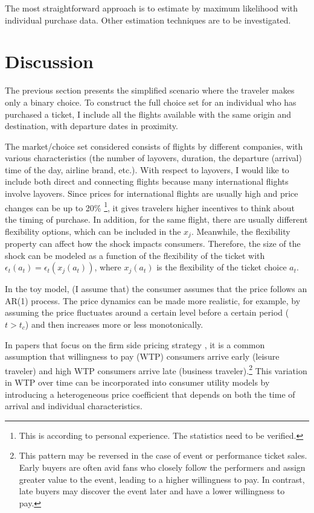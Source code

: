 \documentclass[12pt]{article}
\begin{document}
The most straightforward approach is to estimate by maximum likelihood with
individual purchase data. Other estimation techniques are to be investigated.

\section{Discussion}

The previous section presents the simplified scenario where the traveler makes
only a binary choice. To construct the full choice set for an individual who
has purchased a ticket, I include all the flights available with the same
origin and destination, with departure dates in proximity.

The market/choice set considered consists of flights by different companies,
with various characteristics (the number of layovers, duration, the departure
(arrival) time of the day, airline brand, etc.). With respect to layovers, I
would like to include both direct and connecting flights because many
international flights involve layovers. Since prices for international flights
are usually high and price changes can be up to 20\% \footnote{This is
    according to personal experience. The statistics need to be verified.}, it
gives travelers higher incentives to think about the timing of purchase. In
addition, for the same flight, there are usually different flexibility options,
which can be included in the $x_j$. Meanwhile, the flexibility property can
affect how the shock impacts consumers. Therefore, the size of the shock can be
modeled as a function of the flexibility of the ticket with
$\epsilon_t(a_t)=\epsilon_t(x_j(a_t))$, where $x_j(a_t)$ is the flexibility of
the ticket choice $a_t$.

In the toy model, (I assume that) the consumer assumes that the price follows
an AR(1) process. The price dynamics can be made more realistic, for example,
by assuming the price fluctuates around a certain level before a certain period
($t>t_c$) and then increases more or less monotonically.

In papers that focus on the firm side pricing strategy
\citep{williams2022welfare,betancourt2022dynamic}, it is a common assumption
that willingness to pay (WTP) consumers arrive early (leisure traveler) and
high WTP consumers arrive late (business traveler).\footnote{This pattern may
    be reversed in the case of event or performance ticket sales. Early buyers are
    often avid fans who closely follow the performers and assign greater value to
    the event, leading to a higher willingness to pay. In contrast, late buyers may
    discover the event later and have a lower willingness to pay.} This variation
in WTP over time can be incorporated into consumer utility models by
introducing a heterogeneous price coefficient that depends on both the time of
arrival and individual characteristics.

\pagebreak \newpage 
\end{document}
